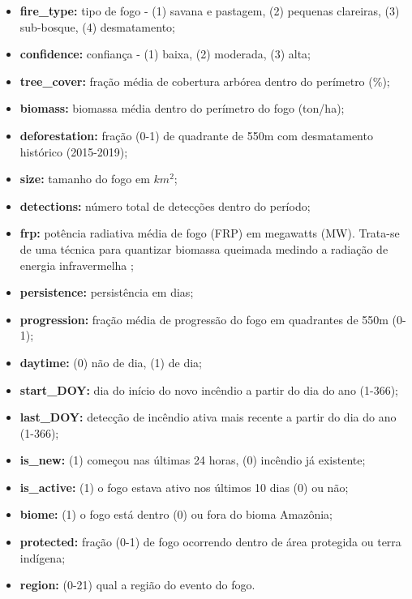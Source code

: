 \begin{multicols}{2}
    

\begin{itemize}
    \item \textbf{fire\_type:} tipo de fogo - (1) savana e pastagem, (2) pequenas clareiras, (3) sub-bosque, (4) desmatamento;
    \item \textbf{confidence:} confiança - (1) baixa, (2) moderada, (3) alta;
    \item \textbf{tree\_cover:} fração média de cobertura arbórea dentro do perímetro (\%);
    \item \textbf{biomass:} biomassa média dentro do perímetro do fogo (ton/ha);
    \item \textbf{deforestation:} fração (0-1) de quadrante de 550m com desmatamento histórico (2015-2019);
    \item \textbf{size:} tamanho do fogo em $km^2$;
    \item \textbf{detections:} número total de detecções dentro do período;
    \item \textbf{frp:} potência radiativa média de fogo (FRP) em megawatts (MW).  Trata-se de uma técnica para quantizar biomassa queimada medindo a radiação de energia infravermelha \cite{NASAMODIS};
    \item \textbf{persistence:} persistência em dias;
    \item \textbf{progression:} fração média de progressão do fogo em quadrantes de 550m (0-1);
    \item \textbf{daytime:} (0) não de dia, (1) de dia;
    \item \textbf{start\_DOY:} dia do início do novo incêndio a partir do dia do ano (1-366);
    \item \textbf{last\_DOY:} detecção de incêndio ativa mais recente a partir do dia do ano (1-366);
    \item \textbf{is\_new:} (1) começou nas últimas 24 horas, (0) incêndio já existente;
    \item \textbf{is\_active:} (1) o fogo estava ativo nos últimos 10 dias (0) ou não;
    \item \textbf{biome:} (1) o fogo está dentro (0) ou fora do bioma Amazônia;
    \item \textbf{protected:} fração (0-1) de fogo ocorrendo dentro de área protegida ou terra indígena;
    \item \textbf{region:} (0-21) qual a região do evento do fogo.
\end{itemize}
\end{multicols}

